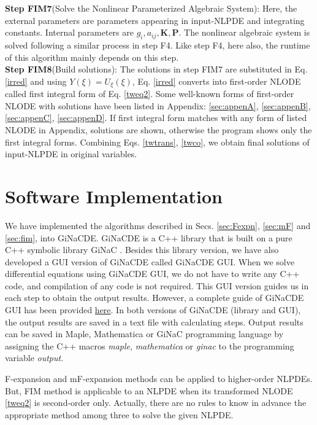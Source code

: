 \documentclass[prd,aps,floats,showkeys,nofootinbib,notitlepage]{revtex4-2}
\begin{document}
	
	\textbf{Step FIM7}(Solve the Nonlinear Parameterized Algebraic System): Here, the external parameters are parameters appearing in input-NLPDE and integrating constants. Internal parameters are $g_i,a_{ij},\boldsymbol{K},\boldsymbol{P}$. The nonlinear algebraic system is solved following a similar process in step F4. Like step F4, here also, the runtime of this algorithm mainly depends on this step.\\
	
	\textbf{Step FIM8}(Build solutions): The solutions in step FIM7 are substituted in Eq. \eqref{irred} and using $Y(\xi)=U_\xi(\xi)$, Eq. \eqref{irred} converts into first-order NLODE called first integral form of Eq. \eqref{tweq2}. Some well-known forms of first-order NLODE with solutions have been listed in Appendix: \ref{sec:appenA}, \ref{sec:appenB}, \ref{sec:appenC}, \ref{sec:appenD}. If first integral form matches with any form of listed NLODE in Appendix, solutions are shown, otherwise the program shows only the first integral forms. Combining Eqs. \eqref{twtrans}, \eqref{twco}, we obtain final solutions of input-NLPDE in original variables.\\
	
	
	\section{Software Implementation}\label{sec:imple}
	We have implemented the algorithms described in Secs. \ref{sec:Fexpn}, \ref{sec:mF} and \ref{sec:fim}, into GiNaCDE. GiNaCDE is a C++ library that is built on a pure C++ symbolic library GiNaC \cite{ginac}. Besides this library version, we have also developed a GUI version of GiNaCDE called GiNaCDE GUI. When we solve differential equations using GiNaCDE GUI, we do not have to write any C++ code, and compilation of any code is not required. This GUI version guides us in each step to obtain the output results. However, a complete guide of GiNaCDE GUI has been provided \href{https://sourceforge.net/projects/ginacde}{here}. In both versions of GiNaCDE (library and GUI), the output results are saved in a text file with calculating steps. Output results can be saved in Maple, Mathematica or GiNaC programming language by assigning the C++ macros {\em maple}, {\em mathematica} or {\em ginac} to the programming variable {\em {output}}. 
	
	F-expansion and mF-expansion methods can be applied to higher-order NLPDEs. But, FIM method is applicable to an NLPDE when its transformed NLODE \eqref{tweq2} is second-order only. Actually, there are no rules to know in advance the appropriate method among three to solve the given NLPDE. 
	
\end{document}
